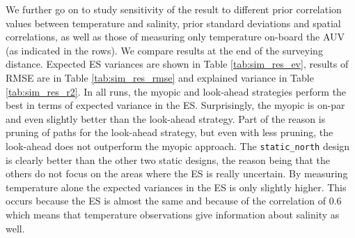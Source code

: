 \documentclass[aoas]{imsart}
\begin{document}
We further go on to study sensitivity of the result to different prior
correlation values between temperature and salinity, prior standard
deviations and spatial correlations, as well as those of measuring
only temperature on-board the AUV (as indicated in the rows). We
compare results at the end of the surveying distance. Expected ES
variances are shown in Table \ref{tab:sim_res_ev}, results of RMSE are
in Table \ref{tab:sim_res_rmse} and explained variance in Table
\ref{tab:sim_res_r2}.  In all runs, the myopic and look-ahead
strategies perform the best in terms of expected variance in the
ES. Surprisingly, the myopic is on-par and even slightly better than
the look-ahead strategy. Part of the reason is pruning of paths for
the look-ahead strategy, but even with less pruning, the look-ahead
does not outperform the myopic approach. %
The \texttt{static\_north} design is clearly better than the other two
static designs, the reason being that the others do not focus on the
areas where the ES is really uncertain.  By measuring temperature
alone the expected variances in the ES is only slightly higher. This
occurs because the ES is almost the same and because of the
correlation of $0.6$ which means that temperature observations give
information about salinity as well.
\end{document}
